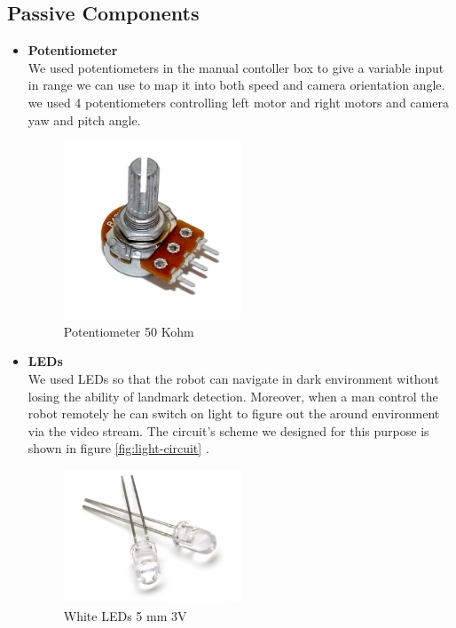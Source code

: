 \documentclass[12pt]{book}
\begin{document}
\subsection{Passive Components}
\begin{itemize}
	\item \textbf{Potentiometer}\\
	We used potentiometers in the manual contoller box to give a variable input in range we can use to map it into both speed and camera orientation angle. we used 4 potentiometers controlling left motor and right motors and camera yaw and pitch angle.
	\begin{figure}
		\centering
		\includegraphics[width =0.5\textwidth]{Fig/Electronics/pot.jpg}
		\caption{Potentiometer 50 Kohm }
		\label{fig:pot}
	\end{figure}

	\item \textbf{LEDs}\\
	We used LEDs so that the robot can navigate in dark environment without losing the ability of landmark detection. Moreover, when a man control the robot remotely he can switch on light to figure out the around environment via the video stream. The circuit's scheme we designed for this purpose is shown in figure \ref{fig:light-circuit} .
	\begin{figure}
		\centering
		\includegraphics[width =0.5\textwidth]{Fig/Electronics/LED.jpg}
		\caption{White LEDs 5 mm 3V}
		\label{fig:led}
	\end{figure}


\end{itemize}
\end{document}
